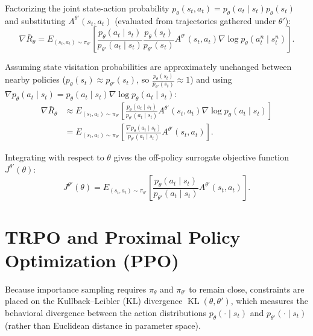 \documentclass[11pt, a4paper]{article}
\begin{document}
Factorizing the joint state-action probability $p_\theta(s_t, a_t) = p_\theta(a_t \mid s_t) p_\theta(s_t)$ and substituting $A^{\theta'}(s_t, a_t)$ (evaluated from trajectories gathered under $\theta'$):
\begin{equation}\label{eq:ppo-factorized-importance-gradient}
    \nabla \bar{R}_\theta = E_{(s_t, a_t) \sim \pi_{\theta'}}\left[\frac{p_\theta(a_t \mid s_t)}{p_{\theta'}(a_t \mid s_t)} \frac{p_\theta(s_t)}{p_{\theta'}(s_t)} A^{\theta'}(s_t, a_t) \nabla \log p_\theta(a_t^n \mid s_t^n)\right].
\end{equation}

Assuming state visitation probabilities are approximately unchanged between nearby policies ($p_\theta(s_t) \approx p_{\theta'}(s_t)$, so $\frac{p_\theta(s_t)}{p_{\theta'}(s_t)} \approx 1$) and using $\nabla p_\theta(a_t \mid s_t) = p_\theta(a_t \mid s_t) \nabla \log p_\theta(a_t \mid s_t)$:
\begin{align}
    \nabla \bar{R}_\theta &\approx E_{(s_t, a_t) \sim \pi_{\theta'}}\left[\frac{p_\theta(a_t \mid s_t)}{p_{\theta'}(a_t \mid s_t)} A^{\theta'}(s_t, a_t) \nabla \log p_\theta(a_t \mid s_t)\right] \nonumber \\
    &= E_{(s_t, a_t) \sim \pi_{\theta'}}\left[\frac{\nabla p_\theta(a_t \mid s_t)}{p_{\theta'}(a_t \mid s_t)} A^{\theta'}(s_t, a_t)\right].\label{eq:ppo-surrogate-gradient}
\end{align}

Integrating with respect to $\theta$ gives the off-policy surrogate objective function $J^{\theta'}(\theta)$:
\begin{equation}\label{eq:ppo-surrogate-objective}
    J^{\theta'}(\theta) = E_{(s_t, a_t) \sim \pi_{\theta'}}\left[\frac{p_\theta(a_t \mid s_t)}{p_{\theta'}(a_t \mid s_t)} A^{\theta'}(s_t, a_t)\right].
\end{equation}

\section{TRPO and Proximal Policy Optimization (PPO)}

Because importance sampling requires $\pi_\theta$ and $\pi_{\theta'}$ to remain close, constraints are placed on the Kullback--Leibler (KL) divergence $\operatorname{KL}(\theta, \theta')$, which measures the behavioral divergence between the action distributions $p_\theta(\cdot \mid s_t)$ and $p_{\theta'}(\cdot \mid s_t)$ (rather than Euclidean distance in parameter space).
\end{document}

